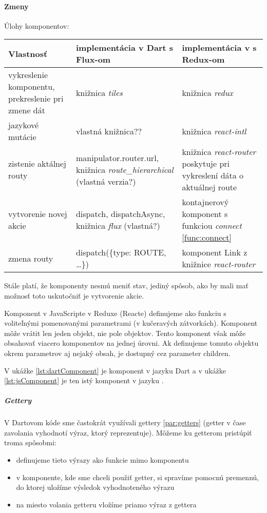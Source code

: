 \paragraph{Zmeny}
\NEW{}
Úlohy komponentov:
\begin{tabular}{| p{4cm} | p{5cm} | p{5cm} |}
 \hline
   Vlastnosť & implementácia v Dart s Flux-om & implementácia v \JS{} s Redux-om \\
  \hline
  \hline
   vykreslenie komponentu, prekreslenie pri zmene dát & 
   knižnica \emph{tiles} &
   knižnica \emph{redux} \\
  \hline
   jazykové mutácie & 
   vlastná knižnica?? \TODO{} & 
   knižnica \emph{react-intl} \\
  \hline
   zistenie aktálnej routy & 
   manipulator.router.url, knižnica \emph{route\_hierarchical} (vlastná verzia?) \TODO{} & 
   knižnica \emph{react-router} poskytuje pri vykreslení dáta o aktuálnej route \\
  \hline
   vytvorenie novej akcie & 
   dispatch, dispatchAsync, knižnica \emph{flux} (vlastná?) \TODO{} & 
   kontajnerový komponent s funkciou \emph{connect} \ref{func:connect} \\
  \hline
   zmena routy & 
   dispatch(\{type: ROUTE, \ldots\}) & 
   komponent Link z knižnice \emph{react-router} \\
  \hline
 \end{tabular}

%

Stále platí, že komponenty nesmú meniť stav, jediný spôsob, ako by mali mať možnosť toto uskutočniť je vytvorenie akcie.

Komponent v JavaScripte v Reduxe (Reacte) %
definujeme ako funkciu s voliteľnými pomenovanými parametrami (v kučeravých zátvorkách). %
Komponent môže vrátit len jeden objekt, nie pole objektov. Tento komponent však môže obsahovať viacero komponentov na jednej úrovni.
Ak definujeme tomuto objektu okrem parametrov aj nejaký obsah, je dostupný cez parameter children.%

V ukážke \ref{lst:dartComponent} je komponent v jazyku Dart a v ukážke \ref{lst:jsComponent} je ten istý komponent v jazyku \JS{}.

\subparagraph{Gettery} \NEW{}
V Dartovom kóde sme častokrát využívali gettery \ref{par:getters} (getter v čase zavolania vyhodnotí výraz, ktorý reprezentuje). Môžeme ku getterom pristúpiť troma spôsobmi: 
\begin{itemize}
  \item definujeme tieto výrazy ako funkcie mimo komponentu
  \item v komponente, kde sme chceli použiť getter, si spravíme pomocnú premennú, do ktorej uložíme výsledok vyhodnoteného výrazu
  \item na miesto volania getteru vložíme priamo výraz z gettera
\end{itemize}

